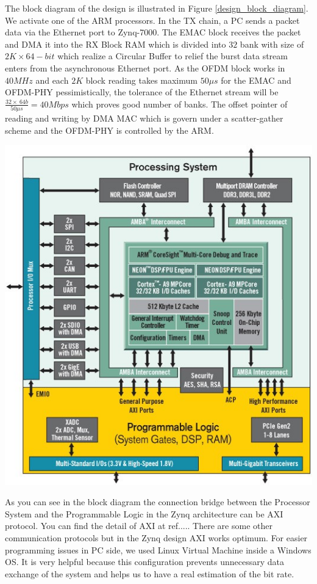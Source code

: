 The block diagram of the design is illustrated in Figure \ref{design_block_diagram}. We activate one of the ARM processors. In the TX chain, a PC sends a packet data via the Ethernet port to Zynq-7000. The EMAC block receives the packet and DMA it into the RX Block RAM which is divided into $32$ bank with size of $2K \times 64-bit$ which realize a Circular Buffer to relief the burst data stream enters from the asynchronous Ethernet port. As the OFDM block works in $40 MHz$ and each $2K$ block reading takes maximum $50\mu s$ for the EMAC and OFDM-PHY pessimistically, the tolerance of the Ethernet stream will be $\frac{32 \times \ 64b}{50\mu s} = 40Mbps$ which proves good number of banks. The offset pointer of reading and writing by DMA MAC which is govern under a scatter-gather scheme and the OFDM-PHY is controlled by the ARM.\\

\begin{center}
\includegraphics[width=\textwidth]{content/fig/zynq_inside.JPG}
\label{design_block_diagram}
\end{center}

As you can see in the block diagram the connection bridge between the Processor System and the Programmable Logic in the Zynq architecture can be AXI protocol. You can find the detail of AXI at ref..... There are some other communication protocols but in the Zynq design AXI works optimum.
For easier programming issues in PC side, we used Linux Virtual Machine inside a Windows OS. It is very helpful because this configuration prevents unnecessary data exchange of the system and helps us to have a real estimation of the bit rate.\\

